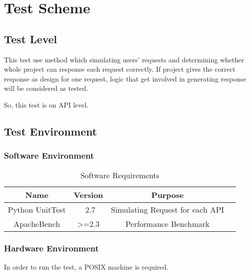 \section{Test Scheme}
\label{sec:test_scheme}
  \subsection{Test Level}
    This test use method which simulating users' requests
    and determining whether whole project can response each request correctly.
    If project gives the correct response as design for one request, logic that get involved in generating response will be considered as tested.

    So, this test is on API level.

  \subsection{Test Environment}
    \subsubsection{Software Environment}
    \begin{table}[H]
        \begin{tabular}{c|c|c|c}
          \hline
          Name & Version & Purpose \\ \hline
          Python UnitTest & ~2.7 & Simulating Request for each API \\ \hline
          ApacheBench & >=2.3 & Performance Benchmark \\ \hline
        \end{tabular}
        \caption{Software Requirements\label{tab:Software}}
      \end{table}
    \subsubsection{Hardware Environment}
      In order to run the test, a POSIX machine is required.
